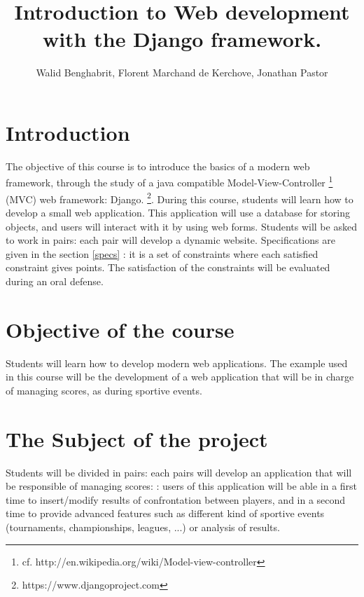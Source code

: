 \documentclass{article}         %
\title{Introduction to Web development with the Django framework.}
\author{Walid Benghabrit, Florent Marchand de Kerchove, Jonathan Pastor}
\begin{document}
\maketitle


\section{Introduction}

The objective of this course is to introduce the basics of a modern web 
framework, through the study of a java compatible Model-View-Controller 
\footnote{cf. http://en.wikipedia.org/wiki/Model-view-controller} (MVC) web 
framework: Django. 
\footnote{https://www.djangoproject.com}.
\newline
\newline
During this course, students will learn how to develop a small web application. 
This application will use a database for storing objects, and users will 
interact with it by using web forms.
\newline
\newline
Students will be asked to work in pairs: each pair will develop a dynamic 
website. Specifications are given in the section \ref{specs} : it is a set of 
constraints where each satisfied constraint gives points. The satisfaction of 
the constraints will be evaluated during an oral defense.


\section{Objective of the course}

Students will learn how to develop modern web applications. The example used in
this course will be the development of a web application that will be in charge
of managing scores, as during sportive events. 


\section{The Subject of the project}

Students will be divided in pairs: each pairs will develop an application that 
will be responsible of managing scores: : users of this application will be able
in a first time to insert/modify results of confrontation between players, and 
in a second time to provide advanced features such as different kind of sportive
events (tournaments, championships, leagues, ...) or analysis of results.
\end{document}
